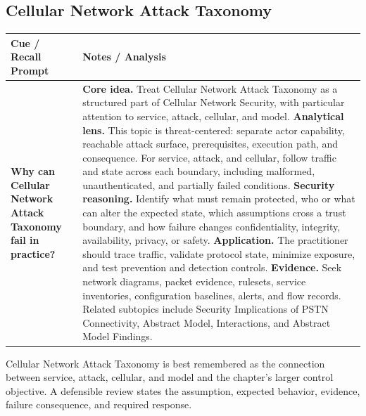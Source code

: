 \documentclass[11pt]{article}
\newcommand{\CornellHeader}{%
\rowcolor{Navy}\color{white}\bfseries Cue / Recall Prompt & \color{white}\bfseries Notes / Analysis\\\hline}
\newcommand{\CornellRow}[2]{%
\cellcolor{CueGray}\RaggedRight\textbf{#1} & \RaggedRight #2\\\hline}
\begin{document}
\subsection*{Cellular Network Attack Taxonomy}
\begin{longtable}{>{\RaggedRight\arraybackslash}p{}|>{\RaggedRight\arraybackslash}p{}}
\CornellHeader
\CornellRow{Why can Cellular Network Attack Taxonomy fail in practice?}{\textbf{Core idea.} Treat Cellular Network Attack Taxonomy as a structured part of Cellular Network Security, with particular attention to service, attack, cellular, and model. \textbf{Analytical lens.} This topic is threat-centered: separate actor capability, reachable attack surface, prerequisites, execution path, and consequence. For service, attack, and cellular, follow traffic and state across each boundary, including malformed, unauthenticated, and partially failed conditions. \textbf{Security reasoning.} Identify what must remain protected, who or what can alter the expected state, which assumptions cross a trust boundary, and how failure changes confidentiality, integrity, availability, privacy, or safety. \textbf{Application.} The practitioner should trace traffic, validate protocol state, minimize exposure, and test prevention and detection controls. \textbf{Evidence.} Seek network diagrams, packet evidence, rulesets, service inventories, configuration baselines, alerts, and flow records. Related subtopics include Security Implications of PSTN Connectivity, Abstract Model, Interactions, and Abstract Model Findings.}
\end{longtable}
\begin{topicsummary}
Cellular Network Attack Taxonomy is best remembered as the connection between service, attack, cellular, and model and the chapter's larger control objective. A defensible review states the assumption, expected behavior, evidence, failure consequence, and required response.
\end{topicsummary}
\end{document}
